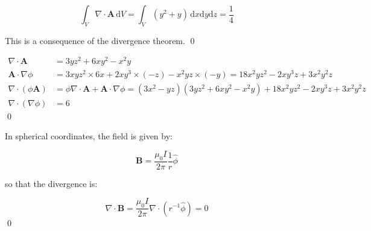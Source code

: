 \documentclass[12pt]{article}
\begin{document}
\begin{equation}
    \int_{V} \nabla \cdot \mathbf{A} \, \mathrm{d}V = \int_{V} (y^{2} + y) \, \mathrm{d}x \mathrm{d}y \mathrm{d}z = \frac{1}{4}
\end{equation}

This is a consequence of the divergence theorem.
\qed



\begin{equation}
\begin{split}
    \nabla \cdot \mathbf{A} &= 3yz^{2} + 6xy^{2} - x^{2}y \\
    \mathbf{A} \cdot \nabla \phi &= 3xyz^{2} \times 6x + 2xy^{3} \times (-z) - x^{2}yz \times (-y) = 18x^{2}yz^{2} - 2xy^{3}z + 3x^{2}y^{2}z \\
    \nabla \cdot (\phi \mathbf{A}) &= \phi \nabla \cdot \mathbf{A} + \mathbf{A} \cdot \nabla \phi = (3x^{2} - yz)(3yz^{2} + 6xy^{2} - x^{2}y) + 18x^{2}yz^{2} - 2xy^{3}z + 3x^{2}y^{2}z \\
    \nabla \cdot (\nabla \phi) &= 6
\end{split}
\end{equation}
\qed


In spherical coordinates, the field is given by:

\begin{equation}
    \mathbf{B} = \frac{\mu_{0}I}{2\pi} \frac{1}{r} \hat{\phi}
\end{equation}

so that the divergence is:

\begin{equation}
    \nabla \cdot \mathbf{B} = \frac{\mu_{0}I}{2\pi} \nabla \cdot (r^{-1} \hat{\phi}) = 0
\end{equation}
\qed
\end{document}
